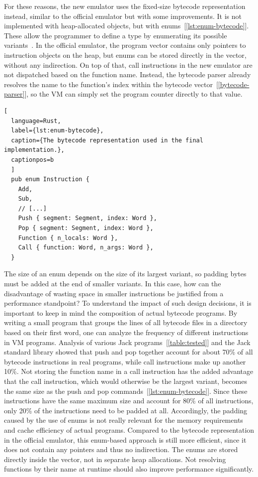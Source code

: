 For these reasons, the new emulator uses the fixed-size bytecode representation instead, similar to the official emulator but with some improvements.
It is not implemented with heap-allocated objects, but with enums~[\ref{lst:enum-bytecode}].
These allow the programmer to define a type by enumerating its possible variants~\cite[Chapter~6]{klabnik2019rust}.
In the official emulator, the program vector contains only pointers to instruction objects on the heap, but enums can be stored directly in the vector, without any indirection.
On top of that, call instructions in the new emulator are not dispatched based on the function name.
Instead, the bytecode parser already resolves the name to the function's index within the bytecode vector~[\ref{bytecode-parser}], so the VM can simply set the program counter directly to that value.
\begin{lstlisting}[
  language=Rust,
  label={lst:enum-bytecode},
  caption={The bytecode representation used in the final implementation.},
  captionpos=b
  ]
  pub enum Instruction {
    Add,
    Sub,
    // [...]
    Push { segment: Segment, index: Word },
    Pop { segment: Segment, index: Word },
    Function { n_locals: Word },
    Call { function: Word, n_args: Word },
  }
\end{lstlisting}
The size of an enum depends on the size of its largest variant, so padding bytes must be added at the end of smaller variants.
In this case, how can the disadvantage of wasting space in smaller instructions be justified from a performance standpoint?
To understand the impact of such design decisions, it is important to keep in mind the composition of actual bytecode programs.
By writing a small program that groups the lines of all bytecode files in a directory based on their first word, one can analyze the frequency of different instructions in VM programs.
Analysis of various Jack programs~[\ref{table:tested}] and the Jack standard library showed that push and pop together account for about 70\% of all bytecode instructions in real programs, while call instructions make up another 10\%.
Not storing the function name in a call instruction has the added advantage that the call instruction, which would otherwise be the largest variant, becomes the same size as the push and pop commands~[\ref{lst:enum-bytecode}].
Since these instructions have the same maximum size and account for 80\% of all instructions, only 20\% of the instructions need to be padded at all.
Accordingly, the padding caused by the use of enums is not really relevant for the memory requirements and cache efficiency of actual programs.
Compared to the bytecode representation in the official emulator, this enum-based approach is still more efficient, since it does not contain any pointers and thus no indirection.
The enums are stored directly inside the vector, not in separate heap allocations.
Not resolving functions by their name at runtime should also improve performance significantly.


